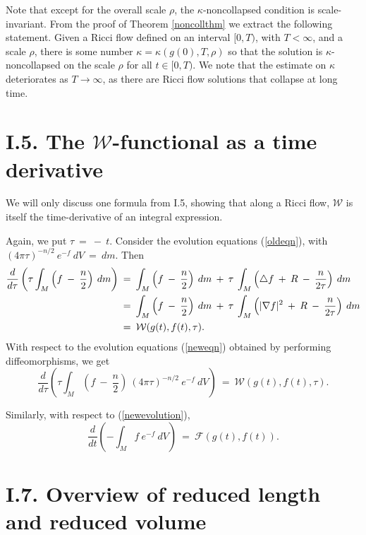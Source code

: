 \documentclass[12pt]{amsart}
\numberwithin{equation}{section}
\theoremstyle{plain}
\theoremstyle{definition}
\theoremstyle{remark}
\begin{document}
Note that except for the overall scale $\rho$, the $\kappa$-noncollapsed
condition is scale-invariant.
From the proof of Theorem \ref{noncollthm} we extract the following
statement. Given a Ricci flow defined on
an interval $[0, T)$, with $T < \infty$, and a scale $\rho$, there
is some number $\kappa = \kappa(g(0), T, \rho)$ so that the solution is
$\kappa$-noncollapsed on the scale $\rho$ for all $t \in [0, T)$.
We note that the estimate on $\kappa$ deteriorates as $T \rightarrow
\infty$, as there are Ricci flow solutions that collapse at 
long time.

\section{I.5. The ${\mathcal W}$-functional as a time derivative} \label{I.5}

We will only discuss one formula from I.5, showing that along a Ricci flow,
${\mathcal W}$ is itself the time-derivative of an integral expression.

Again, we put $\tau \: = \: - \: t$. Consider the evolution equations
(\ref{oldeqn}), with
$(4 \pi \tau)^{-n/2} \: e^{-f} \: dV \: =\: dm$. Then
\begin{align}
\frac{d}{d\tau} \left( \tau \int_M \left( f \: - \: \frac{n}{2} \right)
\: dm \right) \: & = \:
\int_M \left( f \: - \: \frac{n}{2} \right)
\: dm \: + \: \tau \: \int_M  \left( \triangle f \: + \: R \: - \:
\frac{n}{2\tau} \right) \: dm \\
& = \:
\int_M \left( f \: - \: \frac{n}{2} \right)
\: dm \: + \: \tau \: \int_M  \left( |\nabla f|^2 \: + \: R \: - \:
\frac{n}{2\tau} \right) \: dm \notag \\
& = \: {\mathcal W}(g(t), f(t), \tau). \notag
\end{align}
With respect to the evolution equations
(\ref{neweqn}) obtained by performing diffeomorphisms, we get
\begin{equation}
\frac{d}{d\tau} \left( \tau \int_M \left( f \: - \: \frac{n}{2} \right)
\: (4 \pi \tau)^{-n/2} \: e^{-f} \: dV \right) \: 
 = \: {\mathcal W}(g(t), f(t), \tau). 
\end{equation}

Similarly, with respect to (\ref{newevolution}),
\begin{equation}
\frac{d}{dt} \left(- \int_M f
\: e^{-f} \: dV \right) \: 
 = \: {\mathcal F}(g(t), f(t)). 
\end{equation}

\section{I.7. Overview of reduced length and reduced volume} \label{I.7}
\end{document}
